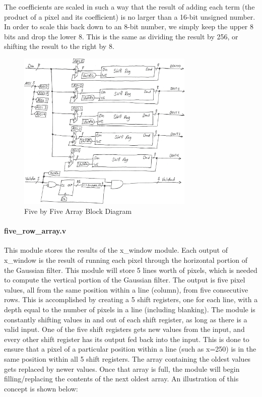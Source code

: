 The coefficients are scaled in such a way that the result of adding each term 
(the product of a pixel and its coefficient) is no larger than a 16-bit unsigned 
number. In order to scale this back down to an 8-bit number, we simply keep the 
upper 8 bits and drop the lower 8. This is the same as dividing the result by 
256, or shifting the result to the right by 8.

\begin{figure}
    \centering
    \includegraphics[width=0.75\textwidth]{processed_image_pngs/array.png}
    \caption{Five by Five Array Block Diagram}
    \label{fig:array}
\end{figure}


\paragraph{five\_row\_array.v}
This module stores the results of the x\_window module. Each output of x\_window 
is the result of running each pixel through the horizontal portion of the 
Gaussian filter. This module will store 5 lines worth of pixels, which is needed 
to compute the vertical portion of the Gaussian filter. The output is five pixel 
values, all from the same position within a line (column), from five consecutive 
rows. This is accomplished by creating a 5 shift registers, one for each line, 
with a depth equal to the number of pixels in a line (including blanking).
The module is constantly shifting values in and out of each shift register, as 
long as there is a valid input. One of the five shift registers gets new values 
from the input, and every other shift register has its output fed back into the 
input. This is done to ensure that a pixel of a particular position within 
a line (such as x=250) is in the same position within all 5 shift registers. The 
array containing the oldest values gets replaced by newer values. Once that 
array is full, the module will begin filling/replacing the contents of the next 
oldest array. An illustration of this concept is shown below: 

